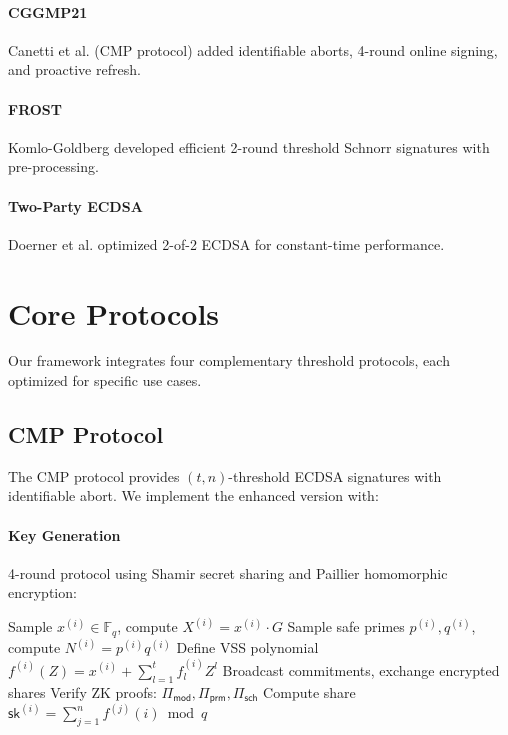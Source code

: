 \documentclass[11pt,twocolumn]{article}
\begin{document}
\paragraph{CGGMP21} Canetti et al. \cite{canetti2021} (CMP protocol) added identifiable aborts, 4-round online signing, and proactive refresh.

\paragraph{FROST} Komlo-Goldberg \cite{komlo2020} developed efficient 2-round threshold Schnorr signatures with pre-processing.

\paragraph{Two-Party ECDSA} Doerner et al. \cite{doerner2018} optimized 2-of-2 ECDSA for constant-time performance.

\section{Core Protocols}

Our framework integrates four complementary threshold protocols, each optimized for specific use cases.

\subsection{CMP Protocol}

The CMP protocol \cite{canetti2021} provides $(t,n)$-threshold ECDSA signatures with identifiable abort. We implement the enhanced version with:

\paragraph{Key Generation} 4-round protocol using Shamir secret sharing and Paillier homomorphic encryption:
\begin{algorithmic}[1]
\State Sample $x^{(i)} \in \mathbb{F}_q$, compute $X^{(i)} = x^{(i)} \cdot G$
\State Sample safe primes $p^{(i)}, q^{(i)}$, compute $N^{(i)} = p^{(i)} q^{(i)}$
\State Define VSS polynomial $f^{(i)}(Z) = x^{(i)} + \sum_{l=1}^t f^{(i)}_l Z^l$
\State Broadcast commitments, exchange encrypted shares
\State Verify ZK proofs: $\Pi_{\textsf{mod}}, \Pi_{\textsf{prm}}, \Pi_{\textsf{sch}}$
\State Compute share $\textsf{sk}^{(i)} = \sum_{j=1}^n f^{(j)}(i) \bmod q$
\end{algorithmic}
\end{document}
